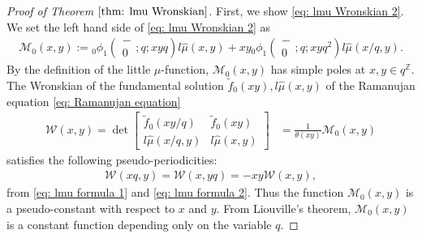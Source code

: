 \documentclass[a4paper]{article}
\newcommand{\Zz}{\mathbb{Z}}
\newcommand{\hyper}[4]{\left( \begin{matrix} #1 \\ #2 \end{matrix};#3;#4\right)}
\numberwithin{equation}{section}
\theoremstyle{plain}
\newtheorem{lem}{Lemma}
\begin{document}
\begin{proof}[Proof of Theorem $\ref{thm: lmu Wronskian}$]
First, we show \eqref{eq: lmu Wronskian 2}. 
We set the left hand side of \eqref{eq: lmu Wronskian 2} as
\begin{align*}
\mathcal{M}_0(x,y):={}_0\phi_1\hyper{-}{0}{q}{xyq}l\widehat{\mu}(x,y)+xy{}_0\phi_1\hyper{-}{0}{q}{xyq^2}l\widehat{\mu}(x/q,y). 
\end{align*}
By the definition of the little $\mu$-function, $\mathcal{M}_0(x,y)$ has simple poles at $x, y\in q^\Zz$. 
The Wronskian of the fundamental solution $\widetilde{f}_0(xy), l\widehat{\mu}(x,y)$ of the Ramanujan equation \eqref{eq: Ramanujan equation}
\begin{align*}
\mathcal{W}(x,y)=\det \begin{bmatrix}
\widetilde{f}_0(xy/q) & \widetilde{f}_0(x y) \\
l\widehat{\mu}(x/q,y) & l\widehat{\mu}(x,y)
\end{bmatrix}
  &=\frac{1}{\theta(xy)}\mathcal{M}_0(x,y)
\end{align*}
satisfies the following pseudo-periodicities: 
\begin{align*}
\mathcal{W}(x q,y)=\mathcal{W}(x,y q)=-x y \mathcal{W}(x,y), 
\end{align*}
from \eqref{eq: lmu formula 1} and \eqref{eq: lmu formula 2}. 
Thus the function $\mathcal{M}_0(x,y)$ is a pseudo-constant with respect to $x$ and $y$. 
From Liouville's theorem, $\mathcal{M}_0(x,y)$ is a constant function depending only on the variable $q$. 

\end{proof}
\end{document}
